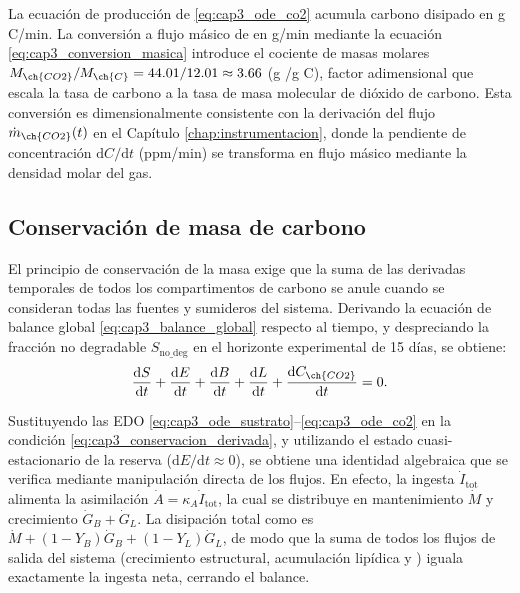 La ecuación de producción de  \eqref{eq:cap3_ode_co2} acumula carbono disipado en g C/min. La conversión a flujo másico de  en g/min mediante la ecuación \eqref{eq:cap3_conversion_masica} introduce el cociente de masas molares $M_{\ch{CO2}}/M_{\ch{C}} = 44.01/12.01 \approx 3.66$ (g /g C), factor adimensional que escala la tasa de carbono a la tasa de masa molecular de dióxido de carbono. Esta conversión es dimensionalmente consistente con la derivación del flujo $\dot{m}_{\ch{CO2}}(t)$ en el Capítulo \ref{chap:instrumentacion}, donde la pendiente de concentración $\mathrm{d}C/\mathrm{d}t$ (ppm/min) se transforma en flujo másico mediante la densidad molar del gas.

\subsection{Conservación de masa de carbono}
\label{subsec:cap3_conservacion_resumen}

El principio de conservación de la masa exige que la suma de las derivadas temporales de todos los compartimentos de carbono se anule cuando se consideran todas las fuentes y sumideros del sistema. Derivando la ecuación de balance global \eqref{eq:cap3_balance_global} respecto al tiempo, y despreciando la fracción no degradable $S_{\mathrm{no\_deg}}$ en el horizonte experimental de 15 días, se obtiene:
\begin{equation}
    \frac{\mathrm{d}S}{\mathrm{d}t} + \frac{\mathrm{d}E}{\mathrm{d}t} + \frac{\mathrm{d}B}{\mathrm{d}t} + \frac{\mathrm{d}L}{\mathrm{d}t} + \frac{\mathrm{d}C_{\ch{CO2}}}{\mathrm{d}t} = 0.
    \label{eq:cap3_conservacion_derivada}
\end{equation}

Sustituyendo las EDO \eqref{eq:cap3_ode_sustrato}--\eqref{eq:cap3_ode_co2} en la condición \eqref{eq:cap3_conservacion_derivada}, y utilizando el estado cuasi-estacionario de la reserva ($\mathrm{d}E/\mathrm{d}t \approx 0$), se obtiene una identidad algebraica que se verifica mediante manipulación directa de los flujos. En efecto, la ingesta $\dot{I}_{\mathrm{tot}}$ alimenta la asimilación $\dot{A} = \kappa_A \dot{I}_{\mathrm{tot}}$, la cual se distribuye en mantenimiento $\dot{M}$ y crecimiento $\dot{G}_B + \dot{G}_L$. La disipación total como  es $\dot{M} + (1-Y_B)\dot{G}_B + (1-Y_L)\dot{G}_L$, de modo que la suma de todos los flujos de salida del sistema (crecimiento estructural, acumulación lipídica y ) iguala exactamente la ingesta neta, cerrando el balance.

